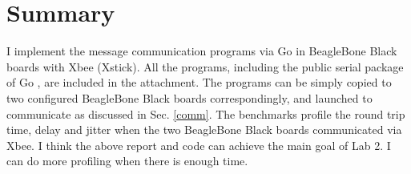 \documentclass[a4paper,12pt]{article}
\theoremstyle{mytheor}
\begin{document}
\section{Summary}

I implement the message communication programs via Go in BeagleBone Black boards with Xbee (Xstick). All the programs, including the public serial package of Go \cite{goserial}, are included in the attachment. The programs can be simply copied to two configured BeagleBone Black boards correspondingly, and launched to communicate as discussed in Sec. \ref{comm}. 
The benchmarks profile the round trip time, delay and jitter when the two BeagleBone Black boards communicated via Xbee. 
I think the above report and code can achieve the main goal of Lab 2. 
I can do more profiling when there is enough time.







 

 
\end{document}
